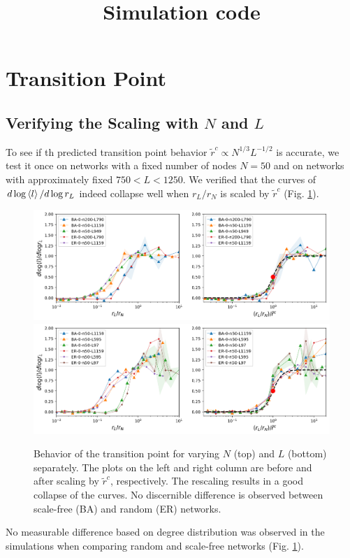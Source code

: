 \documentclass[12pt]{article}%
\begin{document}
\title{Simulation code}
\maketitle
\tableofcontents

\section{Transition Point}
\subsection{Verifying the Scaling with $N$ and $L$}
To see if th predicted transition point behavior $\tilde{r}^c \propto N^{1/3}L^{-1/2}$ is accurate, we test it once on networks with a fixed number of nodes $N=50$ and on networks with approximately fixed $750<L<1250$. 
We verified that the curves of $d\log\left<l\right>/d\log r_L$ indeed collapse well when $r_L/r_N$ is scaled by $\tilde{r}^c$ (Fig. \ref{fig:trans-nl}). 

\begin{figure}
    \centering
    \includegraphics[width=.7\textwidth]{fig-09-19/phase-collapse-N.png}
    \includegraphics[width=.7\textwidth]{fig-09-19/phase-collapse-L.png}
    \caption{\scriptsize 
    Behavior of the transition point for varying $N$ (top) and $L$ (bottom) separately. 
    The plots on the left and right column are before and after scaling by $\tilde{r}^c$, respectively.
    The rescaling results in a good collapse of the curves. 
    No discernible difference is observed between scale-free (BA) and random (ER) networks. 
    }
    \label{fig:trans-nl}
\end{figure}
No measurable difference based on degree distribution was observed in the simulations when comparing random and scale-free networks (Fig. \ref{fig:trans-nl}).
\end{document}
